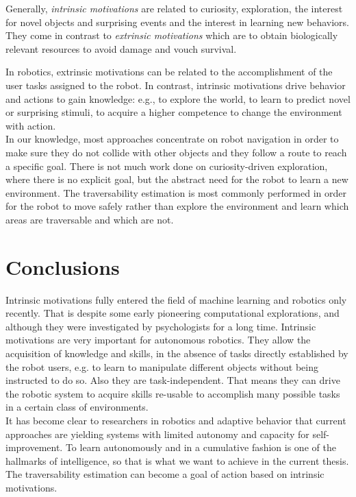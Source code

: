 \documentclass[12pt,a4paper]{report}
\newcommand{\term}{\textit}
\begin{document}
	Generally, \term{intrinsic motivations} are related to curiosity, exploration, 
	the interest for novel objects and surprising events and the interest in 
	learning new behaviors. They come in contrast to \term{extrinsic motivations} 
	which are to obtain biologically relevant resources to avoid damage and vouch 
	survival.
	\par
	In robotics, extrinsic motivations can be related to the accomplishment of the 
	user tasks assigned to the robot. In contrast, intrinsic motivations drive 
	behavior and actions to gain knowledge: e.g., to explore the world, to learn to 
	predict novel or surprising stimuli, to acquire a higher competence to change 
	the environment with action.
	\\
	
	In our knowledge, most approaches concentrate on robot navigation in order to 
	make sure they do not collide with other objects and they follow a route to 
	reach a specific goal. There is not much work done on curiosity-driven 
	exploration, where there is no explicit goal, but the abstract need for the 
	robot to learn a new environment. The traversability estimation is most commonly 
	performed in order for the robot to move safely rather than explore the 
	environment and learn which areas are traversable and which are not.
	\\
		
	\section{Conclusions}
	\label{sec:bg:concl}
	
	Intrinsic motivations fully entered the field of machine learning and robotics 
	only recently. That is despite some early pioneering computational explorations, 
	and although they were investigated by psychologists for a long time. Intrinsic 
	motivations are very important for autonomous robotics. They allow the acquisition 
	of knowledge and skills, in the absence of tasks directly established by the robot 
	users, e.g. to learn to manipulate different objects without being instructed to 
	do so. Also they are task-independent. That means they can drive the robotic system 
	to acquire skills re-usable to accomplish many possible tasks in a certain class 
	of environments.
	\\
	
	It has become clear to researchers in robotics and adaptive behavior that 
	current approaches are yielding systems with limited autonomy and capacity for 
	self-improvement. To learn autonomously and in a cumulative fashion is one of 
	the hallmarks of intelligence, so that is what we want to achieve in the current 
	thesis. The traversability estimation can become a goal of action based on 
	intrinsic motivations.
	\\
	
\end{document}
